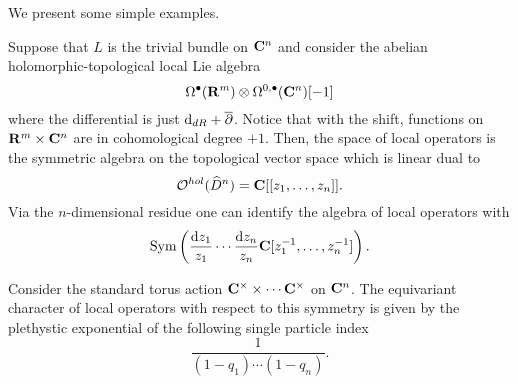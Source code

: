 \parsec[s:pexp]


\parsec[s:localops]

We present some simple examples. 

Suppose that $L$ is the trivial bundle on $\mathbf{C}^n$ and consider the abelian holomorphic-topological local Lie algebra 
\[
\Omega^\bullet(\mathbf{R}^m) \otimes \Omega^{0,\bullet}(\mathbf{C}^n) [-1]
\]
where the differential is just ${\rm d}_{dR} + \overline{\partial}$. 
Notice that with the shift, functions on $\mathbf{R}^m \times \mathbf{C}^n$ are in cohomological degree $+1$.
Then, the space of local operators is the symmetric algebra on the topological vector space which is linear dual to 
\[
\mathcal O^{hol}(\widehat{D}^n) = \mathbf{C}[[z_1,\ldots,z_n]] .
\]
Via the $n$-dimensional residue one can identify the algebra of local operators with 
\[
\operatorname{Sym}\left(\frac{{\rm d} z_1}{z_1} \cdots \frac{{\rm d} z_n}{z_n}  \mathbf{C}[z_1^{-1}, \ldots , z_n^{-1}]\right) .
\]

Consider the standard torus action $\mathbf{C}^\times \times \cdots \mathbf{C}^\times$ on $\mathbf{C}^n$. 
The equivariant character of local operators with respect to this symmetry is given by the plethystic exponential of the following single particle index
\[
\frac{1}{(1-q_1)\cdots (1-q_n)} .
\]


%
%
%
%
%

